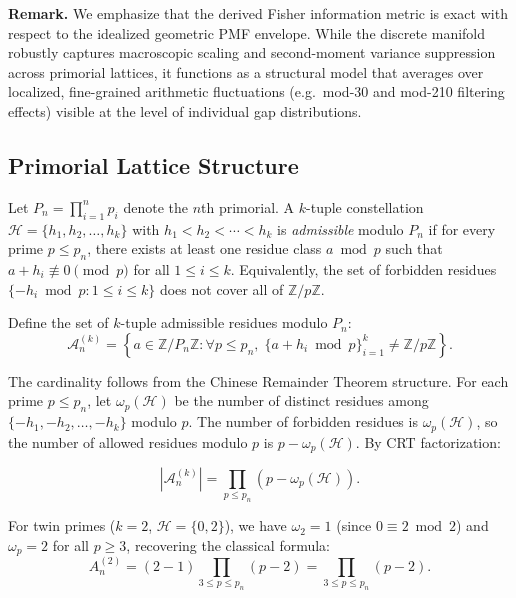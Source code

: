 \documentclass[11pt]{article}
\theoremstyle{remark}
\begin{document}
\noindent \textbf{Remark.} We emphasize that the derived Fisher information metric is exact with respect to the idealized geometric PMF envelope. While the discrete manifold robustly captures macroscopic scaling and second-moment variance suppression across primorial lattices, it functions as a structural model that averages over localized, fine-grained arithmetic fluctuations (e.g.\ mod-30 and mod-210 filtering effects) visible at the level of individual gap distributions.

\subsection{Primorial Lattice Structure}

Let $P_n = \prod_{i=1}^n p_i$ denote the $n$th primorial. A $k$-tuple
constellation $\mathcal{H} = \{h_1, h_2, \ldots, h_k\}$ with
$h_1 < h_2 < \cdots < h_k$ is \emph{admissible} modulo $P_n$ if for
every prime $p \leq p_n$, there exists at least one residue class
$a \bmod p$ such that $a + h_i \not\equiv 0 \pmod{p}$ for all
$1 \leq i \leq k$. Equivalently, the set of forbidden residues
$\{-h_i \bmod p : 1 \leq i \leq k\}$ does not cover all of
$\mathbb{Z}/p\mathbb{Z}$.

Define the set of $k$-tuple admissible residues modulo $P_n$:
\begin{equation}
\mathcal{A}_n^{(k)} = \left\{ a \in \mathbb{Z}/P_n\mathbb{Z} :
\forall p \leq p_n, \; \{a + h_i \bmod p\}_{i=1}^k \neq \mathbb{Z}/p\mathbb{Z}
\right\}.
\end{equation}

The cardinality follows from the Chinese Remainder Theorem structure.
For each prime $p \leq p_n$, let $\omega_p(\mathcal{H})$ be the number
of distinct residues among $\{-h_1, -h_2, \ldots, -h_k\}$ modulo $p$.
The number of forbidden residues is $\omega_p(\mathcal{H})$, so the
number of allowed residues modulo $p$ is $p - \omega_p(\mathcal{H})$.
By CRT factorization:

\begin{equation}
\left|\mathcal{A}_n^{(k)}\right| = \prod_{p \leq p_n}
\left(p - \omega_p(\mathcal{H})\right).
\label{eq:adm-count}
\end{equation}

For twin primes ($k=2$, $\mathcal{H} = \{0, 2\}$), we have
$\omega_2 = 1$ (since $0 \equiv 2 \bmod 2$) and $\omega_p = 2$
for all $p \geq 3$, recovering the classical formula:
\begin{equation}
A_n^{(2)} = (2 - 1) \prod_{3 \leq p \leq p_n} (p - 2)
= \prod_{3 \leq p \leq p_n} (p - 2).
\end{equation}
\end{document}
